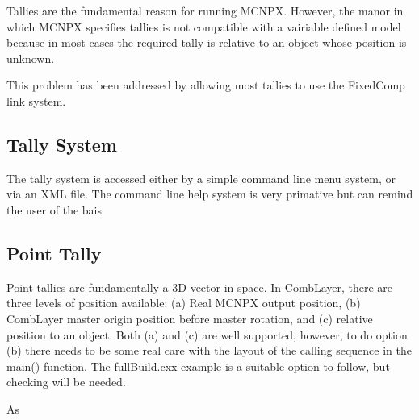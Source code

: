 
Tallies are the fundamental reason for running MCNPX. However, the
manor in which MCNPX specifies tallies is not compatible with a
vairiable defined model because in most cases the required tally is relative 
to an object whose position is unknown. 

This problem has been addressed by allowing most tallies to use the 
FixedComp link system. 

\subsection{Tally System}

The tally system is accessed either by a simple command line menu
system, or via an XML file. The command line help system is very
primative but can remind the user of the bais

\subsection{Point Tally}
\label{PointTally}

Point tallies are fundamentally a 3D vector in space. In CombLayer,
there are three levels of position available: (a) Real MCNPX output
position, (b) CombLayer master origin position before master rotation,
and (c) relative position to an object. Both (a) and (c) are well
supported, however, to do option (b) there needs to be some real care
with the layout of the calling sequence in the main() function. The
fullBuild.cxx example is a suitable option to follow, but checking
will be needed.

As
